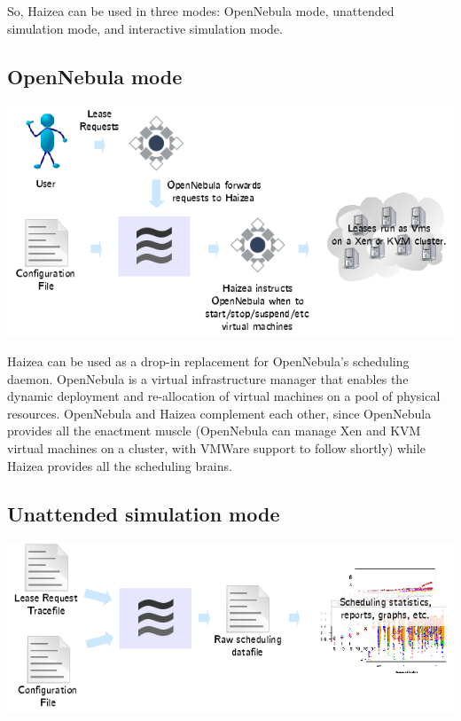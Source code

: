 So, Haizea can be used in three modes: OpenNebula mode, unattended simulation mode, and interactive simulation mode.

\subsection{OpenNebula mode}

\begin{center}
\includegraphics{images/mode_opennebula.png}
\end{center}

Haizea can be used as a drop-in replacement for OpenNebula's scheduling daemon. OpenNebula is a virtual infrastructure manager that enables the dynamic deployment and re-allocation of virtual machines on a pool of physical resources. OpenNebula and Haizea complement each other, since OpenNebula provides all the enactment muscle (OpenNebula can manage Xen and KVM virtual machines on a cluster, with VMWare support to follow shortly) while Haizea provides all the scheduling brains.

\subsection{Unattended simulation mode}

\begin{center}
\includegraphics{images/mode_unattended_simulation.png}
\end{center}

